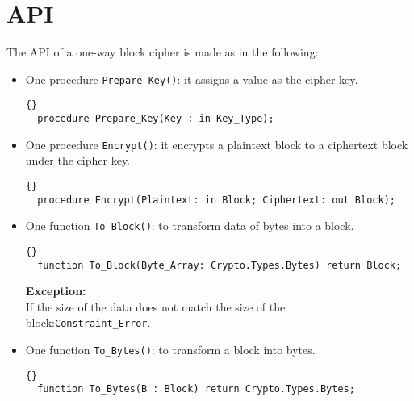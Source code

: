 \section{API}
The API of a one-way block cipher is made as in the following:
\begin{itemize}
\item One procedure \texttt{Prepare\_Key()}: it assigns a value as the cipher key.
\begin{lstlisting}{}
  procedure Prepare_Key(Key : in Key_Type);
\end{lstlisting}
\item One procedure \texttt{Encrypt()}: it encrypts a plaintext block to a ciphertext block under the cipher key.
\begin{lstlisting}{}
  procedure Encrypt(Plaintext: in Block; Ciphertext: out Block);
\end{lstlisting}
\item One function \texttt{To\_Block()}: to transform data of bytes into a block.
\begin{lstlisting}{}
  function To_Block(Byte_Array: Crypto.Types.Bytes) return Block;
\end{lstlisting}
\textbf{Exception:}\\ 
If the size of the data does not match the size of the block:\quad\texttt{Constraint\_Error}.
\item One function \texttt{To\_Bytes()}: to transform a block into bytes.
\begin{lstlisting}{}
  function To_Bytes(B : Block) return Crypto.Types.Bytes;
\end{lstlisting}
\end{itemize}
